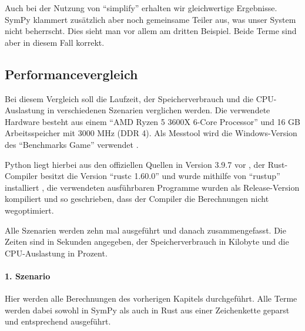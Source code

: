 \documentclass[11pt,a4paper, ngerman]{article}
\begin{document}
Auch bei der Nutzung von ``simplify'' erhalten wir gleichwertige Ergebnisse. SymPy klammert zusätzlich aber noch gemeinsame Teiler aus, was unser System nicht beherrscht. Dies sieht man vor allem am dritten Beispiel. Beide Terme sind aber in diesem Fall korrekt.

\subsection{Performancevergleich}
Bei diesem Vergleich soll die Laufzeit, der Speicherverbrauch und die CPU-Auslastung in verschiedenen Szenarien verglichen werden. Die verwendete Hardware besteht aus einem ``AMD Ryzen 5 3600X 6-Core Processor'' und 16 GB Arbeitsspeicher mit 3000 MHz (DDR 4). Als Messtool wird die Windows-Version des ``Benchmarks Game'' verwendet \cite{BenchmarkGameHome} \cite {BenchmarkGameSrc}.

Python liegt hierbei aus den offiziellen Quellen in Version 3.9.7 vor \cite{PythonDownload}, der Rust-Compiler besitzt die Version ``rustc 1.60.0'' und wurde mithilfe von ``rustup'' installiert \cite{RustDownload}, die verwendeten ausführbaren Programme wurden als Release-Version kompiliert und so geschrieben, dass der Compiler die Berechnungen nicht wegoptimiert.

Alle Szenarien werden zehn mal ausgeführt und danach zusammengefasst. Die Zeiten sind in Sekunden angegeben, der Speicherverbrauch in Kilobyte und die CPU-Auslastung in Prozent.

\paragraph{1. Szenario} Hier werden alle Berechnungen des vorherigen Kapitels durchgeführt. Alle Terme werden dabei sowohl in SymPy als auch in Rust aus einer Zeichenkette geparst und entsprechend ausgeführt.
\end{document}
